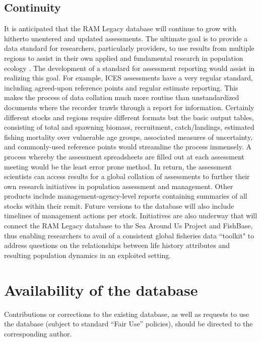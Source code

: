 \documentclass[letterpaper,12pt]{article}
\begin{document}
\subsection{Continuity}
It is anticipated that the RAM Legacy database will continue to grow with hitherto unentered and updated assessments. The ultimate goal is to provide a data standard for researchers, particularly providers, to use results from multiple regions to assist in their own applied and fundamental research in population ecology \citep[for survey data]{Ricard:etal:2009:ices}. The development of a standard for assessment reporting would assist in realizing this goal. For example, ICES assessments have a very regular standard, including agreed-upon reference points and regular estimate reporting. This makes the process of data collation much more routine than unstandardized documents where the recorder trawls through a report for information. Certainly different stocks and regions require different formats but the basic output tables, consisting of total and spawning biomass, recruitment, catch/landings, estimated fishing mortality over vulnerable age groups, associated measures of uncertainty, and commonly-used reference points would streamline the process immensely. A process whereby the assessment spreadsheets are filled out at each assessment meeting would be the least error prone method. In return, the assessment scientists can access results for a global collation of assessments to further their own research initiatives in population assessment and management. Other products include management-agency-level reports containing summaries of all stocks within their remit. Future versions to the database will also include timelines of management actions per stock. Initiatives are also underway that will connect the RAM Legacy database to the Sea Around Us Project and FishBase, thus enabling researchers to avail of a consistent global fisheries data ``toolkit" to address questions on the relationships between life history attributes and resulting population dynamics in an exploited setting.

\begin{comment}
- Weather forecasting and climatology note don't
use these terms (central repository)
\end{comment}

\newpage

\section*{Availability of the database} Contributions or corrections
to the existing database, as well as requests to use the database
(subject to standard ``Fair Use'' policies), should be directed to the
corresponding author.
\end{document}
